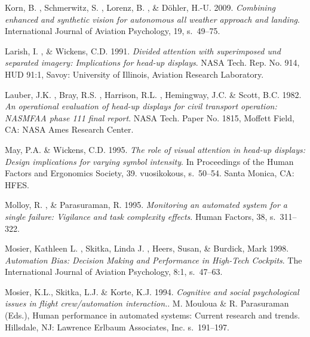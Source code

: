 \documentclass[utf8,bachelor,manualbib]{gradu3}
\begin{document}
\begin{thebibliography}{}
Korn, B. , Schmerwitz, S. , Lorenz, B. , \& Döhler, H.-U. 2009.
\textit{Combining enhanced and synthetic vision for autonomous all weather approach and landing}.
International Journal of Aviation Psychology, 19, s.~49--75.

Larish, I. , \& Wickens, C.D. 1991.
\textit{Divided attention with superimposed und separated imagery: Implications for head-up displays}.
NASA Tech. Rep. No. 914, HUD 91:1, Savoy: University of Illinois, Aviation Research Laboratory.

Lauber, J.K. , Bray, R.S. , Harrison, R.L. , Hemingway, J.C. \& Scott, B.C. 1982.
\textit{An operational evaluation of head-up displays for civil transport operation: NASMFAA phase 111 final report}.
NASA Tech. Paper No. 1815, Moffett Field, CA: NASA Ames Research Center.

May, P.A. \& Wickens, C.D. 1995.
\textit{The role of visual attention in head-up displays: Design implications for varying symbol intensity}.
In Proceedings of the Human Factors and Ergonomics Society, 39. vuosikokous, s.~50--54. Santa Monica, CA: HFES.

Molloy, R. , \& Parasuraman, R. 1995.
\textit{Monitoring an automated system for a single failure: Vigilance and task complexity effects}.
Human Factors, 38, s.~311--322.

Mosier, Kathleen L. , Skitka, Linda J. , Heers, Susan, \& Burdick, Mark 1998.
\textit{Automation Bias: Decision Making and Performance in High-Tech Cockpits}.
The International Journal of Aviation Psychology, 8:1, s.~47--63.

Mosier, K.L., Skitka, L.J. \& Korte, K.J. 1994.
\textit{Cognitive and social psychological issues in flight crew/automation interaction.}.
M. Mouloua \& R. Parasuraman (Eds.), Human performance in automated systems: Current research and trends. Hillsdale, NJ: Lawrence Erlbaum Associates, Inc. s.~191--197.


\end{thebibliography}
\end{document}
